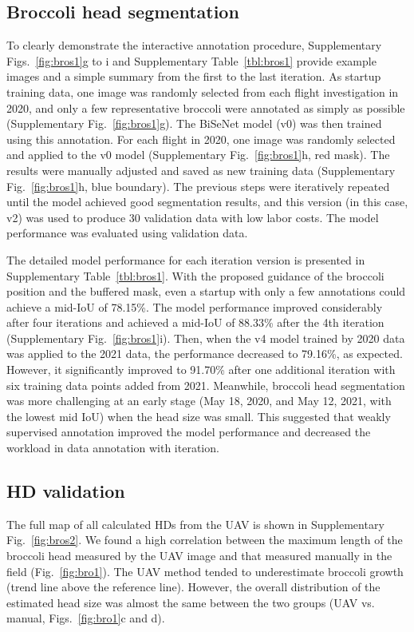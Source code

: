 \subsection{Broccoli head segmentation}

To clearly demonstrate the interactive annotation procedure, Supplementary \linebreak Figs.~\ref{fig:bros1}g to i and Supplementary Table~\ref{tbl:bros1} provide example images and a simple summary from the first to the last iteration. As startup training data, one image was randomly selected from each flight investigation in 2020, and only a few representative broccoli were annotated as simply as possible (Supplementary Fig.~\ref{fig:bros1}g). The BiSeNet model (v0) was then trained using this annotation. For each flight in 2020, one image was randomly selected and applied to the v0 model (Supplementary Fig.~\ref{fig:bros1}h, red mask). The results were manually adjusted and saved as new training data (Supplementary Fig.~\ref{fig:bros1}h, blue boundary). The previous steps were iteratively repeated until the model achieved good segmentation results, and this version (in this case, v2) was used to produce 30 validation data with low labor costs. The model performance was evaluated using validation data.

The detailed model performance for each iteration version is presented in Supplementary Table~\ref{tbl:bros1}. With the proposed guidance of the broccoli position and the buffered mask, even a startup with only a few annotations could achieve a mid-IoU of 78.15\%. The model performance improved considerably after four iterations and achieved a mid-IoU of 88.33\% after the 4th iteration (Supplementary Fig.~\ref{fig:bros1}i). Then, when the v4 model trained by 2020 data was applied to the 2021 data, the performance decreased to 79.16\%, as expected. However, it significantly improved to 91.70\% after one additional iteration with six training data points added from 2021. Meanwhile, broccoli head segmentation was more challenging at an early stage (May 18, 2020, and May 12, 2021, with the lowest mid IoU) when the head size was small. This suggested that weakly supervised annotation improved the model performance and decreased the workload in data annotation with iteration.

\subsection{HD validation}

The full map of all calculated HDs from the UAV is shown in Supplementary Fig.~\ref{fig:bros2}. We found a high correlation between the maximum length of the broccoli head measured by the UAV image and that measured manually in the field (Fig.~\ref{fig:bro1}). The UAV method tended to underestimate broccoli growth (trend line above the reference line). However, the overall distribution of the estimated head size was almost the same between the two groups (UAV vs. manual, Figs.~\ref{fig:bro1}c and d). 

